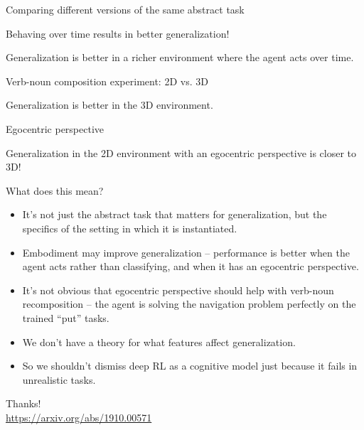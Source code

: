 \documentclass{beamer}
\begin{document}
\begin{frame}{Comparing different versions of the same abstract task}

\end{frame}

\begin{frame}{Behaving over time results in better generalization!}

\end{frame}

\begin{frame}[standout]
Generalization is better in a richer environment where the agent acts over time.
\end{frame}

\begin{frame}{Verb-noun composition experiment: 2D vs. 3D}

\end{frame}

\begin{frame}[standout]
Generalization is better in the 3D environment.
\end{frame}

\begin{frame}{Egocentric perspective}

\end{frame}

\begin{frame}[standout]
Generalization in the 2D environment with an egocentric perspective is closer to 3D!
\end{frame}

\begin{frame}{What does this mean?}
\begin{itemize}
\item It's not just the abstract task that matters for generalization, but the specifics of the setting in which it is instantiated. 
\item Embodiment may improve generalization -- performance is better when the agent acts rather than classifying, and when it has an egocentric perspective.
\item It's not obvious that egocentric perspective should help with verb-noun recomposition -- the agent is solving the navigation problem perfectly on the trained ``put'' tasks.
\item We don't have a theory for what features affect generalization.
\item So we shouldn't dismiss deep RL as a cognitive model just because it fails in unrealistic tasks. 
\end{itemize}
\end{frame}

\begin{frame}[standout]
Thanks!\\
\url{https://arxiv.org/abs/1910.00571}
\end{frame}
\end{document}
